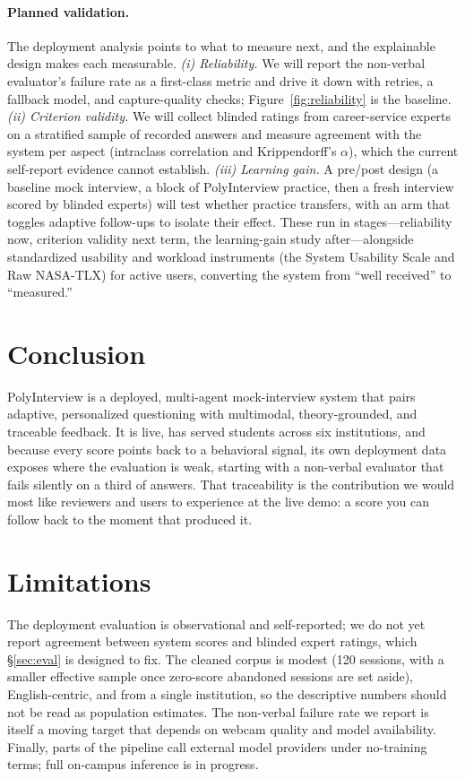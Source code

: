 \documentclass[11pt]{article}
\begin{document}
\paragraph{Planned validation.} The deployment analysis points to what to measure next, and the explainable design makes each measurable. \emph{(i) Reliability.} We will report the non-verbal evaluator's failure rate as a first-class metric and drive it down with retries, a fallback model, and capture-quality checks; Figure~\ref{fig:reliability} is the baseline. \emph{(ii) Criterion validity.} We will collect blinded ratings from career-service experts on a stratified sample of recorded answers and measure agreement with the system per aspect (intraclass correlation and Krippendorff's $\alpha$), which the current self-report evidence cannot establish. \emph{(iii) Learning gain.} A pre/post design (a baseline mock interview, a block of PolyInterview practice, then a fresh interview scored by blinded experts) will test whether practice transfers, with an arm that toggles adaptive follow-ups to isolate their effect. These run in stages---reliability now, criterion validity next term, the learning-gain study after---alongside standardized usability and workload instruments (the System Usability Scale and Raw NASA-TLX) for active users, converting the system from ``well received'' to ``measured.''

\section{Conclusion}
PolyInterview is a deployed, multi-agent mock-interview system that pairs adaptive, personalized questioning with multimodal, theory-grounded, and traceable feedback. It is live, has served students across six institutions, and because every score points back to a behavioral signal, its own deployment data exposes where the evaluation is weak, starting with a non-verbal evaluator that fails silently on a third of answers. That traceability is the contribution we would most like reviewers and users to experience at the live demo: a score you can follow back to the moment that produced it.

\section*{Limitations}
The deployment evaluation is observational and self-reported; we do not yet report agreement between system scores and blinded expert ratings, which §\ref{sec:eval} is designed to fix. The cleaned corpus is modest (120 sessions, with a smaller effective sample once zero-score abandoned sessions are set aside), English-centric, and from a single institution, so the descriptive numbers should not be read as population estimates. The non-verbal failure rate we report is itself a moving target that depends on webcam quality and model availability. Finally, parts of the pipeline call external model providers under no-training terms; full on-campus inference is in progress.
\end{document}
